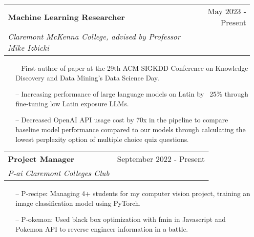 \documentclass[letterpaper,10pt]{article}
\makeatletter
\newcommand{\resumeSubheading}[4]{
  \vspace{-2pt}\item
    \begin{tabular*}{0.97\textwidth}[t]{l@{\extracolsep{\fill}}r}
      \textbf{#1} & #2 \\
      \textit{\small#3} & \textit{\small #4} \\
    \end{tabular*}\vspace{-7pt}
}
\makeatother
\begin{document}
      \resumeSubheading
      {Machine Learning Researcher}{May 2023 - Present}
      {Claremont McKenna College, advised by Professor Mike Izbicki}{}
      \begin{itemize}\small
      \setlength\itemsep{0em}
          \item[--] First author of paper at the 29th ACM SIGKDD Conference on Knowledge Discovery and Data Mining’s Data Science Day.
          \item[--] Increasing performance of large language models on Latin by ~25\% through fine-tuning low Latin exposure LLMs. 
          \item[--] Decreased OpenAI API usage cost by 70x in the pipeline to compare baseline model performance compared to our models through calculating the lowest perplexity option of multiple choice quiz questions.
      \end{itemize}

    \resumeSubheading
      {Project Manager}{September 2022 - Present}
      {P-ai Claremont Colleges Club}{}
      \begin{itemize}\small
      \setlength\itemsep{0em}
        \item[--] P-recipe: Managing 4+ students for my computer vision project, training an image classification model using PyTorch.
        \item[--] P-okemon: Used black box optimization with fmin in Javascript and Pokemon API to reverse engineer information in a battle.

      \end{itemize}
\end{document}
